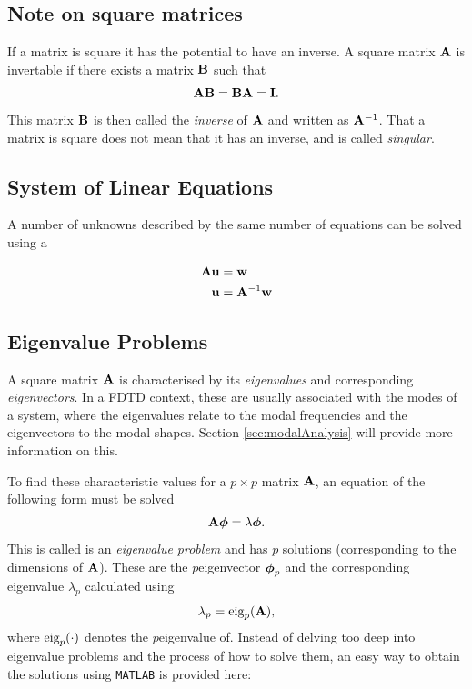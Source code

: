 \subsection{Note on square matrices}
If a matrix is square it has the potential to have an inverse. A square matrix $\mathbf{A}$ is invertable if there exists a matrix $\mathbf{B}$ such that
\begin{equation}
    \mathbf{A} \mathbf{B} = \mathbf{B} \mathbf{A} = \mathbf{I}. 
\end{equation}
This matrix $\mathbf{B}$ is then called the \textit{inverse} of $\mathbf{A}$ and written as $\mathbf{A}^{-1}$.
That a matrix is square does not mean that it has an inverse, and is called \textit{singular}. 


\subsection{System of Linear Equations}\label{sec:linearEquations}
A number of unknowns described by the same number of equations can be solved using a 

\begin{align*}
    \mathbf{A} \mathbf{u} &= \mathbf{w}\\
    \mathbf{u} &= \mathbf{A}^{-1}\mathbf{w}
\end{align*}

\subsection{Eigenvalue Problems}\label{sec:eigenValueProblems}
A square matrix $\mathbf{A}$ is characterised by its \textit{eigenvalues} and corresponding \textit{eigenvectors}. In a FDTD context, these are usually associated with the modes of a system, where the eigenvalues relate to the modal frequencies and  the eigenvectors to the modal shapes. Section \ref{sec:modalAnalysis} will provide more information on this.

To find these characteristic values for a $p\times p$ matrix $\mathbf{A}$, an equation of the following form must be solved 
\begin{equation}
    \mathbf{A} \boldsymbol{\phi} = \lambda \boldsymbol{\phi}.
\end{equation}
This is called is an \textit{eigenvalue problem} and has $p$ solutions (corresponding to the dimensions of $\mathbf{A}$). These are the $p$\th eigenvector $\boldsymbol{\phi}_p$ and the corresponding eigenvalue $\lambda_p$ calculated using
\begin{equation}
    \lambda_p = \text{eig}_p(\mathbf{A}),
\end{equation}
where $\text{eig}_p(\cdot)$ denotes the $p$\th eigenvalue of. Instead of delving too deep into eigenvalue problems and the process of how to solve them, an easy way to obtain the solutions using \texttt{MATLAB} is provided here:

